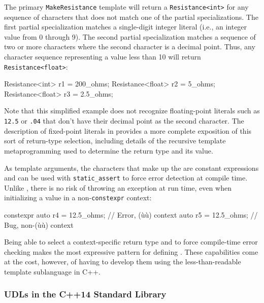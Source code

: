 \noindent The primary \lstinline!MakeResistance! template will return a
\lstinline!Resistance<int>! for any sequence of characters that does not
match one of the partial specializations. The first partial
specialization matches a single-digit integer literal (i.e., an integer
value from 0 through 9). The second partial specialization matches a
sequence of two or more characters where the second character is a
decimal point. Thus, any character sequence representing a value less
than 10 will return \lstinline!Resistance<float>!:

\begin{emcppslisting}[emcppsbatch=e12]
Resistance<int>   r1 = 200_ohms;
Resistance<float> r2 = 5_ohms;
Resistance<float> r3 = 2.5_ohms;
\end{emcppslisting}

\noindent Note that this simplified example does not recognize floating-point
literals such as \lstinline!12.5! or \lstinline!.04! that don't have their
decimal point as the second character. The description of fixed-point
literals in  provides a more complete exposition of this sort
of return-type selection, including details of the recursive template
metaprogramming used to determine the return type and its value.

As template arguments, the characters that make up the  are constant expressions and can be used with
\lstinline!static_assert! to force error detection at compile time. Unlike
, there is no risk of throwing an exception at
run time, even when initializing a value in a non-\lstinline!constexpr!
context:

\begin{emcppslisting}[emcppsbatch=e12]
constexpr auto r4 = 12.5_ohms;  // Error, (ù{}ù) context
          auto r5 = 12.5_ohms;  // Bug, non-(ù{}ù) context
\end{emcppslisting}

\noindent Being able to select a context-specific return type and to force
compile-time error checking makes  the
most expressive pattern for defining . These
capabilities come at the cost, however, of having to develop them using
the less-than-readable template sublanguage in C++.

\subsubsection[UDLs in the C++14 Standard Library]{UDLs in the C++14 Standard Library}\label{udls-in-the-c++14-standard-library}

